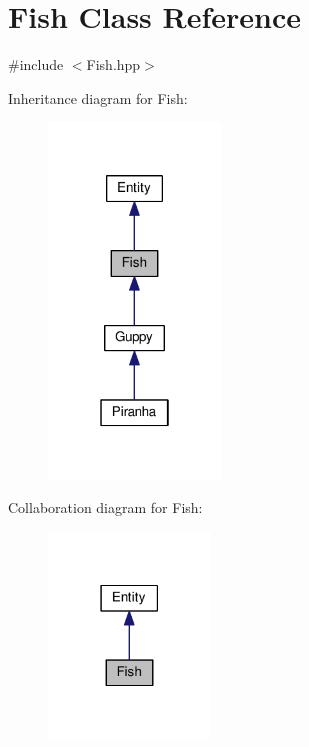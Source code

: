 \hypertarget{classFish}{}\section{Fish Class Reference}
\label{classFish}


{\ttfamily \#include $<$Fish.\+hpp$>$}



Inheritance diagram for Fish\+:\nopagebreak
\begin{figure}[H]
\begin{center}
\leavevmode
\includegraphics[width=130pt]{classFish__inherit__graph}
\end{center}
\end{figure}


Collaboration diagram for Fish\+:\nopagebreak
\begin{figure}[H]
\begin{center}
\leavevmode
\includegraphics[width=122pt]{classFish__coll__graph}
\end{center}
\end{figure}
